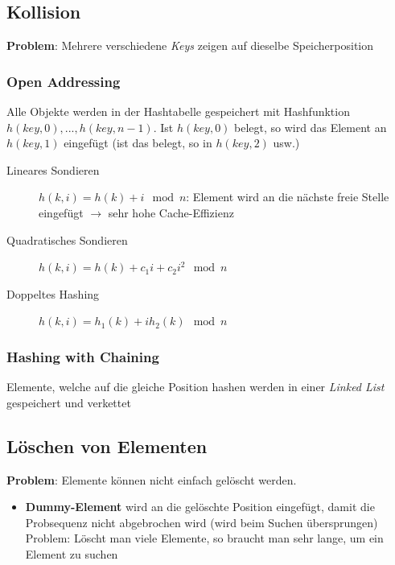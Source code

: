 \begin{sectionbox}
    \subsection{Kollision}
    \textbf{Problem}: Mehrere verschiedene \textit{Keys} zeigen auf dieselbe Speicherposition

    \subsubsection{Open Addressing}
    Alle Objekte werden in der Hashtabelle gespeichert mit Hashfunktion $h(key, 0), ..., h(key, n-1)$.
    Ist $h(key, 0)$ belegt, so wird das Element an $h(key, 1)$ eingefügt (ist das belegt, so in $h(key, 2)$ usw.)
    \begin{description}
        \item[Lineares Sondieren] $h(k, i)=h(k)+i\mod n$: Element wird an die nächste freie Stelle eingefügt $\rightarrow$ sehr hohe Cache-Effizienz
        \item[Quadratisches Sondieren] $h(k, i)=h(k) + c_1i + c_2i^2 \mod n$
        \item[Doppeltes Hashing] $h(k, i) = h_1(k) + i h_2(k) \mod n$
    \end{description}

    \subsubsection{Hashing with Chaining}
    Elemente, welche auf die gleiche Position hashen werden in einer \textit{Linked List} gespeichert und verkettet
\end{sectionbox}

\begin{sectionbox}
    \subsection{Löschen von Elementen}
    \textbf{Problem}: Elemente können nicht einfach gelöscht werden.
    \begin{itemize}
        \item \textbf{Dummy-Element} wird an die gelöschte Position eingefügt, damit die Probsequenz nicht abgebrochen wird (wird beim Suchen übersprungen) \\
              Problem: Löscht man viele Elemente, so braucht man sehr lange, um ein Element zu suchen
    \end{itemize}

\end{sectionbox}

